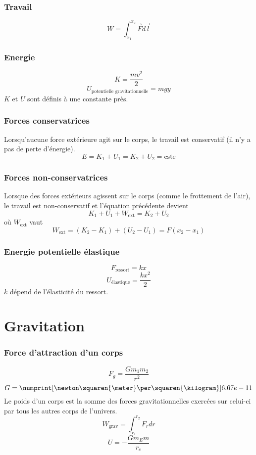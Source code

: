 \section{Travail}
\[ W = \int_{x_1}^{x_2} \vec{F} d\vec{l} \]
\section{Energie}
\[ K = \frac{mv^2}{2} \]
\[ U_{\text{potentielle gravitationnelle}} = mgy \]
$K$ et $U$ sont définis à une constante près.

\section{Forces conservatrices}
Lorsqu'aucune force extérieure agit sur le corps,
le travail est conservatif (il n'y a pas de perte d'énergie).
\[ E = K_1 + U_1 = K_2 + U_2 = \mathrm{cste} \]

\section{Forces non-conservatrices}
Lorsque des forces extérieurs agissent sur le corps
(comme le frottement de l'air),
le travail est non-conservatif et l'équation précédente devient
\[ K_1 + U_1 + W_\mathrm{ext} = K_2 + U_2 \]
où $W_\mathrm{ext}$ vaut
\[ W_\mathrm{ext} = (K_2 - K_1) + (U_2 - U_1) = F(x_2 - x_1) \]

\section{Energie potentielle élastique}
\[ F_{\text{ressort}} = kx \]
\[ U_{\text{élastique}} = \frac{kx^2}{2} \]
$k$ dépend de l'élasticité du ressort.

\part{Gravitation}
\section{Force d'attraction d'un corps}
\[ F_g = \frac{Gm_1m_2}{r^2} \]
\[ G = \numprint[\newton\squaren{\meter}\per\squaren{\kilogram}]
{6.67e-11} \]
Le poids d'un corps est la somme des forces gravitationnelles exercées
sur celui-ci par tous les autres corps de l'univers.
\[ W_\mathrm{grav} = \int_{r_1}^{r_2}F_r dr \]
\[ U = -\frac{Gm_Em}{r_e} \]

